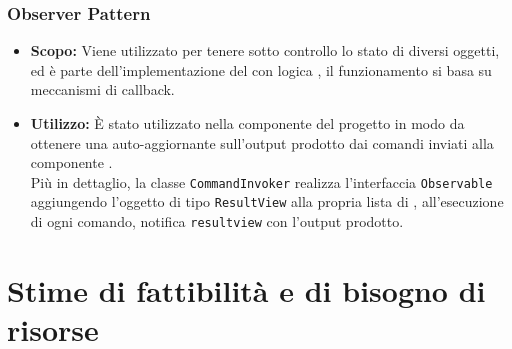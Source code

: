 \documentclass{scalatekids-article}
\begin{document}
\subsubsection{Observer Pattern}

\label{sec:ObserverPattern}

\begin{itemize}
\item \textbf{Scopo:} Viene utilizzato per tenere sotto controllo lo stato di diversi oggetti, ed è parte dell'implementazione
  del   con logica , il funzionamento si basa su meccanismi di callback.
\item \textbf{Utilizzo:} È stato utilizzato nella componente  del progetto in modo da ottenere una 
  auto-aggiornante sull'output prodotto dai comandi inviati alla componente .\\
  Più in dettaglio, la classe \verb=CommandInvoker= realizza l'interfaccia \verb=Observable= aggiungendo l'oggetto di tipo
  \verb=ResultView= alla propria lista di , all'esecuzione di ogni comando, notifica \verb=resultview=
  con l'output prodotto.
\end{itemize}

\section{Stime di fattibilità e di bisogno di risorse}
\end{document}
